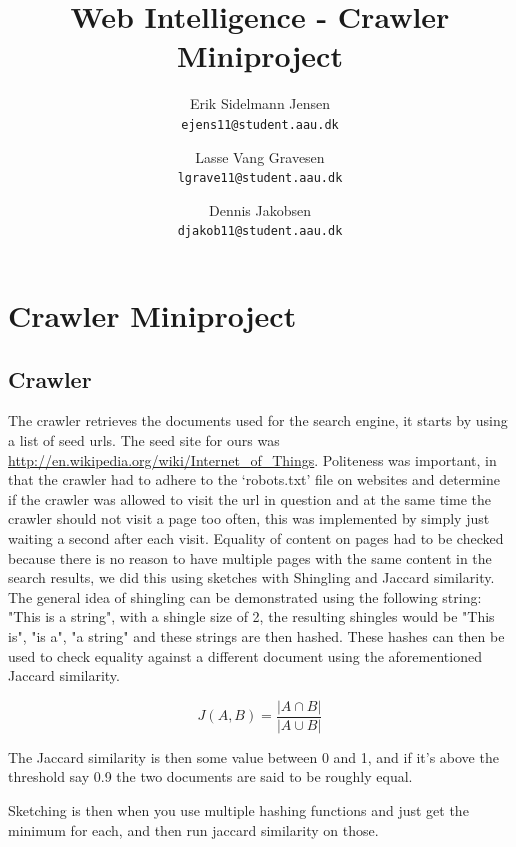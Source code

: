 

\author{
  Erik Sidelmann Jensen\\
  \texttt{ejens11@student.aau.dk}
  \and
  Lasse Vang Gravesen\\
  \texttt{lgrave11@student.aau.dk}
  \and
  Dennis Jakobsen\\
  \texttt{djakob11@student.aau.dk}  
}

\title{Web Intelligence - Crawler Miniproject}
\date{}


	\clearpage\maketitle
	\thispagestyle{empty}
	
	\chapter{Crawler Miniproject}
	\section{Crawler}
	The crawler retrieves the documents used for the search engine, it starts by using a list of seed urls.
	The seed site for ours was \url{http://en.wikipedia.org/wiki/Internet_of_Things}.
	Politeness was important, in that the crawler had to adhere to the `robots.txt' file on websites and determine if the crawler was allowed to visit the url in question and at the same time the crawler should not visit a page too often, this was implemented by simply just waiting a second after each visit. 
	Equality of content on pages had to be checked because there is no reason to have multiple pages with the same content in the search results, we did this using sketches with Shingling and Jaccard similarity. The general idea of shingling can be demonstrated using the following string: "This is a string", with a shingle size of 2, the resulting shingles would be "This is", "is a", "a string" and these strings are then hashed. These hashes can then be used to check equality against a different document using the aforementioned Jaccard similarity. 
	
	$$ J(A,B) = \frac{| A \cap B |}{|A \cup B|} $$
	
	The Jaccard similarity is then some value between 0 and 1, and if it's above the threshold say 0.9 the two documents are said to be roughly equal.
	
	Sketching is then when you use multiple hashing functions and just get the minimum for each, and then run jaccard similarity on those.
	
